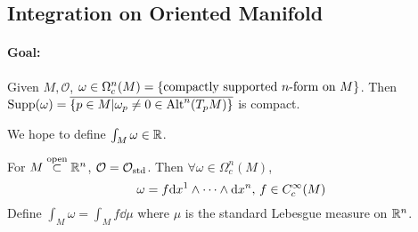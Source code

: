 \subsection{Integration on Oriented Manifold}
\paragraph{Goal:} Given  $ M,\mathcal{O} $,  $ \omega\in  \name{$ \Omega_c^n(M) $} =\{\text{compactly supported  $ n $-form on  $ M $}\} $. Then  $ \mathrm{Supp}(\omega)=\overline{\{p\in M|\omega_p\neq 0\in \mathrm{Alt}^n(T_pM)\}} $ is compact.

We hope to define  $ \int_M\omega\in\mathbb R $.

For  $ M\overset{\text{open}}{\subset} \mathbb R^n $,  $ \mathcal{O}=\mathcal{O}_{\mathrm{std}} $. Then  $ \forall \omega\in \Omega_c^n(M) $,
\[\omega=f\mathrm{d} {x}^1\wedge\cdots\wedge\mathrm{d} {x}^n,\,f\in C_c^\infty(M)\]
Define  $ \int_M\omega=\int_M f\dd \mu $ where  $ \mu $ is the standard Lebesgue measure on  $ \mathbb R^n $.

